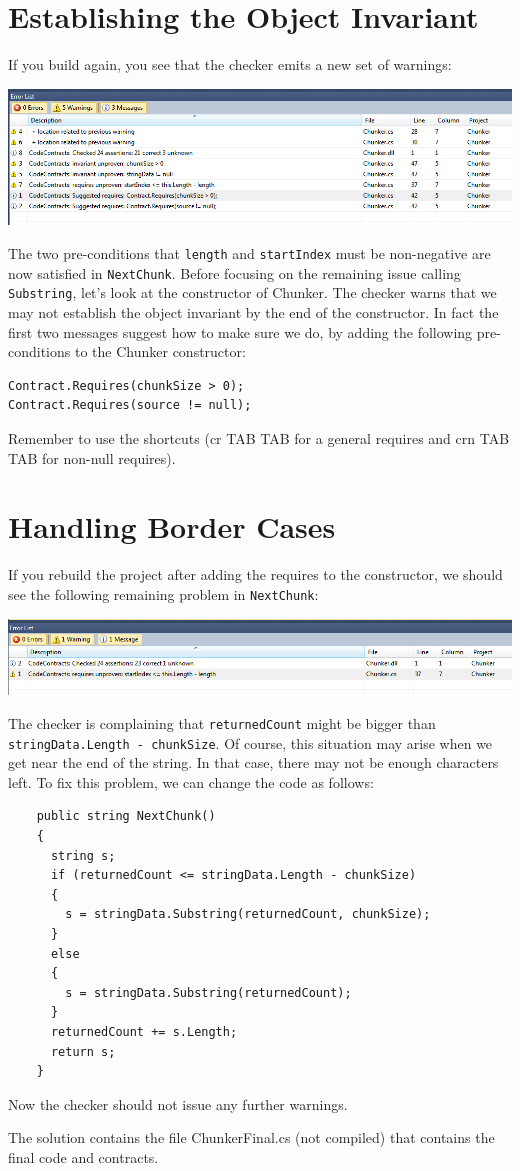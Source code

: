 \documentclass{article}
\newcommand{\code}[1]{\lstinline{#1}}
\begin{document}
\section{Establishing the Object Invariant}
If you build again, you see that the checker emits a new set of warnings:
\begin{center}
  \includegraphics[width=1\columnwidth]{errors2.png}
\end{center}
The two pre-conditions that \code{length} and \code{startIndex} must be non-negative
are now satisfied in \code{NextChunk}. Before focusing on the
remaining issue calling \code{Substring}, let's look at the
constructor of Chunker. The checker warns that we may not establish
the object invariant by the end of the constructor. In fact the first
two messages suggest how to make sure we do, by adding the following
pre-conditions to the Chunker constructor:
\begin{lstlisting}
Contract.Requires(chunkSize > 0);
Contract.Requires(source != null);
\end{lstlisting}
Remember to use the shortcuts (cr TAB TAB for a general requires
and crn TAB TAB for non-null requires).

\section{Handling Border Cases}
If you rebuild the project after adding the requires to the
constructor, we should see the following remaining problem in \code{NextChunk}:
\begin{center}
  \includegraphics[width=1\columnwidth]{errors3.png}
\end{center}
The checker is complaining that \code{returnedCount} might be bigger
than  \code{stringData.Length - chunkSize}.
Of course, this situation
may arise when we get near the end of the string. In that case, there
may not be enough characters left. To fix this problem, we can change
the code as follows:
\begin{lstlisting}
    public string NextChunk()
    {
      string s;
      if (returnedCount <= stringData.Length - chunkSize)
      {
        s = stringData.Substring(returnedCount, chunkSize);
      }
      else
      {
        s = stringData.Substring(returnedCount);
      }
      returnedCount += s.Length;
      return s;
    }
\end{lstlisting}
Now the checker should not issue any further warnings.

The solution contains the file ChunkerFinal.cs (not compiled) that
contains the final code and contracts.
\end{document}
